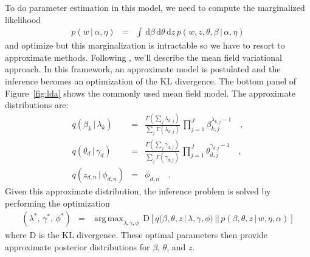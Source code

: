 \documentclass[11pt]{article}
\newcommand{\eqlabel}[1]{\label{eq:#1}}
\newcommand{\fig}[1]{Figure~\ref{fig:#1}}
\newcommand{\dd}{\ensuremath{\, \mathrm{d}}}
\DeclareMathOperator*{\argmax}{arg\,max}
\begin{document}
To do parameter estimation in this model, we need to compute the marginalized
likelihood
\begin{eqnarray}
p(w\,|\,\alpha,\eta) &=& \int\dd\beta\dd\theta\dd z \,
    p(w,z,\theta,\beta\,|\,\alpha,\eta)
\end{eqnarray}
and optimize but this marginalization is intractable so we have to resort to
approximate methods.
Following \citet{lda}, we'll describe the mean field variational approach.
In this framework, an approximate model is postulated and the inference
becomes an optimization of the KL divergence.
The bottom panel of \fig{lda} shows the commonly used mean field model.
The approximate distributions are:
\begin{eqnarray}
q(\beta_k\,|\,\lambda_k) &=&
\frac{\Gamma\left( \sum_j \lambda_{k,j} \right)}{\sum_j \Gamma(\lambda_{k,j})}
\, \prod_{j=1}^J \beta_{k,j}^{\lambda_{k,j}-1} \quad, \\
q(\theta_d\,|\,\gamma_d) &=&
\frac{\Gamma\left( \sum_j \gamma_{d,j} \right)}{\sum_j \Gamma(\gamma_{d,j})}
\, \prod_{j=1}^J \theta_{d,j}^{\gamma_{d,j}-1} \quad, \\
q(z_{d,n}\,|\,\phi_{d,n}) &=& \phi_{d,n} \quad.
\end{eqnarray}
Given this approximate distribution, the inference problem is solved by
performing the optimization
\begin{eqnarray}\eqlabel{opt}
(\lambda^*,\,\gamma^*,\,\phi^*) &=& \argmax_{\lambda,\gamma,\phi}
\,\mathrm{D}\left [ q(\beta,\theta,z\,|\,\lambda,\gamma,\phi)\,||\,
p(\beta,\theta,z\,|\,w,\eta,\alpha)\right ]
\end{eqnarray}
where D is the KL divergence.
These optimal parameters then provide approximate posterior distributions for
$\beta$, $\theta$, and $z$.
\end{document}
